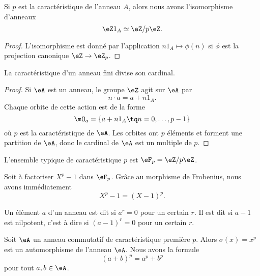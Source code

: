 \begin{lemma}       \label{LemHmDaYH}
    Si \( p\) est la caractéristique de l'anneau \( A\), alors nous avons l'isomorphisme d'anneaux
    \begin{equation}
         \eZ 1_A\simeq\eZ/p\eZ.
    \end{equation}
\end{lemma}

\begin{proof}
    L'isomorphisme est donné par l'application \( n1_A\mapsto \phi(n)\) si \( \phi\) est la projection canonique \( \eZ\to \eZ_p\).
\end{proof}

\begin{proposition}     \label{PropGExaUK}
    La caractéristique d'un anneau fini divise son cardinal.
\end{proposition}

\begin{proof}
    Si \( \eA\) est un anneau, le groupe \( \eZ\) agit sur \( \eA\) par
    \begin{equation}
        n\cdot a=a+n1_A.
    \end{equation}
    Chaque orbite de cette action est de la forme
    \begin{equation}
        \mO_a=\{ a+n1_A\tq n=0,\ldots, p-1 \}
    \end{equation}
    où \( p\) est la caractéristique de \( \eA\). Les orbites ont \( p\) éléments et forment une partition de \( \eA\), donc le cardinal de \( \eA\) est un multiple de \( p\).
\end{proof}

L'ensemble typique de caractéristique \( p\) est \( \eF_p=\eZ/p\eZ\).

\begin{example}
    Soit à factoriser \( X^p-1\) dans \( \eF_p\). Grâce au morphisme de Frobenius, nous avons immédiatement
    \begin{equation}
        X^p-1=(X-1)^p.
    \end{equation}
\end{example}

\begin{definition}
    Un élément \( a\) d'un anneau est dit  si \( a^r=0\) pour un certain \( r\). Il est dit  si \( a-1\) est nilpotent, c'est à dire si \( (a-1)^r=0\) pour un certain \( r\).
\end{definition}

\begin{proposition}     \label{Propqrrdem}
    Soit \( \eA\) un anneau commutatif de caractéristique première \( p\). Alors \( \sigma(x)=x^p\) est un automorphisme de l'anneau \( \eA\). Nous avons la formule
    \begin{equation}
        (a+b)^p=a^p+b^p
    \end{equation}
    pour tout \( a,b\in \eA\).
\end{proposition}

